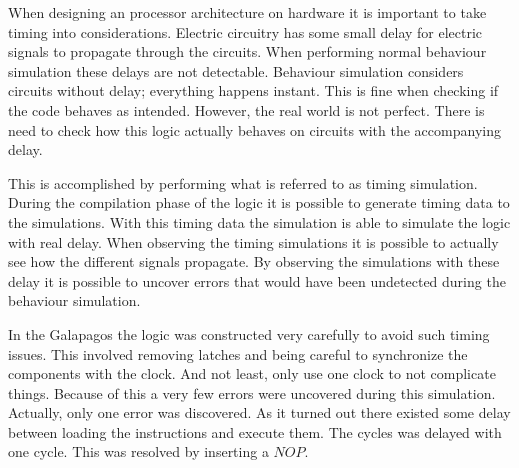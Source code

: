 When designing an processor architecture on hardware it is important to take timing into considerations. Electric circuitry has some small delay for electric signals to propagate through the circuits. When performing normal behaviour simulation these delays are not detectable. Behaviour simulation considers circuits without delay; everything happens instant. This is fine when checking if the code behaves as intended. However, the real world is not perfect. There is need to check how this logic actually behaves on circuits with the accompanying delay. 

This is accomplished by performing what is referred to as timing simulation. During the compilation phase of the logic it is possible to generate timing data to the simulations. With this timing data the simulation is able to simulate the logic with real delay. When observing the timing simulations it is possible to actually see how the different signals propagate. By observing the simulations with these delay it is possible to uncover errors that would have been undetected during the behaviour simulation. 

In the Galapagos the logic was constructed very carefully to avoid such timing issues. This involved removing latches and being careful to synchronize the components with the clock. And not least, only use one clock to not complicate things. Because of this a very few errors were uncovered during this simulation. Actually, only one error was discovered. As it turned out there existed some delay between loading the instructions and execute them. The cycles was delayed with one cycle. This was resolved by inserting a $NOP$.  


